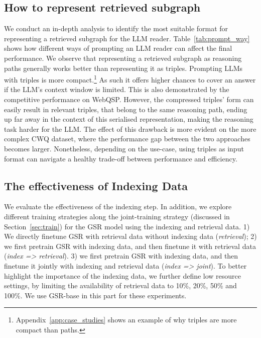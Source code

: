\documentclass[11pt]{article}
\begin{document}
\subsection{How to represent retrieved subgraph}
\label{sec:rq1}
We conduct an in-depth analysis to identify the most suitable format for representing a retrieved subgraph for the LLM reader. Table~\ref{tab:prompt_way} shows how different ways of prompting an LLM reader
can affect the final performance. We observe that representing a retrieved subgraph as reasoning paths generally works better than representing it as triples. Prompting LLMs with triples is more compact.\footnote{Appendix~\ref{app:case_studies} shows an example of why triples are more compact than paths.} As such it offers higher chances to cover an answer if the LLM's context window is limited. This is also demonstrated by the competitive performance on WebQSP. However, the compressed triples' form can easily result in relevant triples, that belong to the same reasoning path, ending up far away in the context of this serialised representation, making the reasoning task harder for the LLM. The effect of this drawback is more evident on the more complex CWQ dataset, where the performance gap between the two approaches becomes larger. Nonetheless, depending on the use-case, using triples as input format can navigate a healthy trade-off between performance and efficiency.






\subsection{The effectiveness of Indexing Data}
\label{sec:rq2}
We evaluate the effectiveness of the indexing step. In addition, we explore different training strategies along the joint-training strategy (discussed in Section~\ref{sec:train}) for the GSR model using the indexing and retrieval data. 1) We directly finetune GSR with retrieval data without indexing data (\textit{retrieval}); 2) we first pretrain GSR with indexing data, and then finetune it with retrieval data (\textit{index => retrieval}). 3) we first pretrain GSR with indexing data, and then finetune it jointly with indexing and retrieval data (\textit{index => joint}). To better highlight the importance of the indexing data, we further define low resource settings, by limiting the availability of retrieval data to 10\%, 20\%, 50\% and 100\%. We use GSR-base in this part for these experiments.
\end{document}
